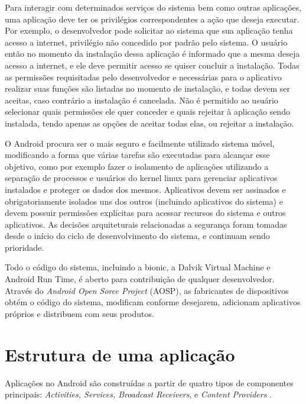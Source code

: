 Para interagir com determinados serviços do sistema bem como outras aplicações, uma aplicação deve ter os privilégios correspondentes a ação que deseja executar. Por exemplo, o desenvolvedor pode solicitar ao sistema que sua aplicação tenha acesso a internet, privilégio não concedido por padrão pelo sistema. O usuário então no momento da instalação dessa aplicação é informado que a mesma deseja acesso a internet, e ele deve permitir acesso se quiser concluir a instalação. Todas as permissões requisitadas pelo desenvolvedor e necessárias para o aplicativo realizar suas funções são listadas no momento de instalação, e todas devem ser aceitas, caso contrário a instalação é cancelada. Não é permitido ao usuário selecionar quais permissões ele quer conceder e quais rejeitar à aplicação sendo instalada, tendo apenas as opções de aceitar todas elas, ou rejeitar a instalação.

O Android procura ser o mais seguro e facilmente utilizado sistema móvel, modificando a forma que várias tarefas são executadas para alcançar esse objetivo, como por exemplo fazer o isolamento de aplicações utilizando a separação de processos e usuários do kernel linux para gerenciar aplicativos instalados e proteger os dados dos mesmos. Aplicativos devem ser assinados e obrigatoriamente isolados uns dos outros (incluindo aplicativos do sistema) e devem possuir permissões explícitas para acessar recursos do sistema e outros aplicativos. As decisões arquiteturais relacionadas a segurança foram tomadas desde o início do ciclo de desenvolvimento do sistema, e continuam sendo prioridade.

Todo o código do sistema, incluindo a bionic, a Dalvik Virtual Machine e Android Run Time, é aberto para contribuição de qualquer desenvolvedor. Através do \textit{Android Open Sorce Project} (AOSP), as fabricantes de dispositivos obtém o código do sistema, modificam conforme desejarem, adicionam aplicativos próprios e distribuem com seus produtos.

\section{Estrutura de uma aplicação}

Aplicações no Android são construídas a partir de quatro tipos de componentes principais: \textit{Activities, Services, Broadcast Receivers}, e \textit{Content Providers} \cite{heuser2014}. 

